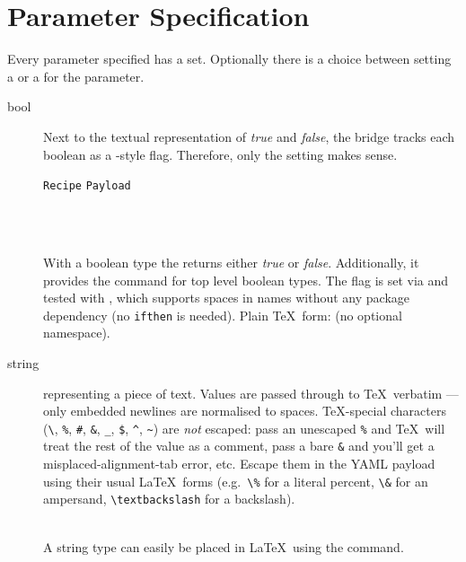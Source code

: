 \documentclass{ltxdoc}
\newcommand\showexample[5][15pt]{%
\begin{minipage}[t]{.5\linewidth - .5 \columnsep}%

\end{minipage}\hspace*{\columnsep}%
\begin{minipage}[t]{.5\linewidth - .5 \columnsep}%

\end{minipage}\\%
}
\begin{document}
    \clearpage

    \section{Parameter Specification}\label{sec:spec}
    Every parameter specified has a  set.
    Optionally there is a choice between setting a  or a  for the parameter.
    \begin{description}
        \item[bool] Next to the textual representation of \textit{true} and \textit{false}, the bridge tracks each boolean as a \cmd{\newif}-style flag.
        Therefore, only the  setting makes sense.\\[5pt]
        \hspace*{5pt}\parbox{\linewidth-5pt}{%
            \hfill\texttt{Recipe}\hfill\hspace*{\columnsep}%
            \hfill\texttt{Payload}\hfill\hspace*{\columnsep}}\\%
        \showexample{1}{1-3}{1}{1-1}
        \DescribeMacro{\param}
        With a boolean type the \cmd{\param} returns either \textit{true} or \textit{false}.
        \DescribeMacro{\ifparam}
        Additionally, it provides the \cmd{\ifparam} command for top level boolean types.
        The flag is set via \cmd{\paramsetbool} and tested with \cmd{\endcsname}, which supports spaces in names without any package dependency (no \texttt{ifthen} is needed).
        Plain \TeX\ form: \cmd{\ifparam} (no optional namespace).
        \item[string] representing a piece of text.
        Values are passed through to \TeX\ verbatim --- only embedded newlines are normalised to spaces.
        \TeX-special characters (\texttt{\textbackslash}, \texttt{\%}, \texttt{\#}, \texttt{\&}, \texttt{\_}, \texttt{\$}, \texttt{\^{}}, \texttt{\~{}}) are \emph{not} escaped: pass an unescaped \texttt{\%} and \TeX\ will treat the rest of the value as a comment, pass a bare \texttt{\&} and you'll get a misplaced-alignment-tab error, etc.
        Escape them in the YAML payload using their usual \LaTeX\ forms (e.g.\ \texttt{\textbackslash\%} for a literal percent, \texttt{\textbackslash\&} for an ampersand, \texttt{\textbackslash textbackslash} for a backslash).\\
        \showexample{4}{4-6}{2}{2-2}
        \DescribeMacro{\param} A string type can easily be placed in \LaTeX\ using the \cmd{\param} command.


\end{description}
\end{document}
